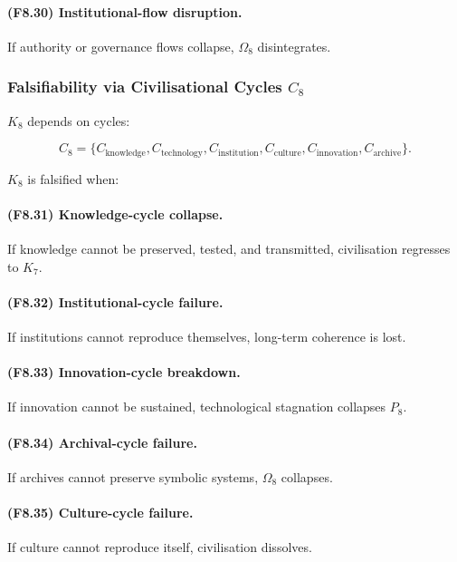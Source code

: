 \paragraph{(F8.30) Institutional-flow disruption.}
If authority or governance flows collapse,
$\Omega_8$ disintegrates.



\subsubsection{Falsifiability via Civilisational Cycles \texorpdfstring{$C_8$}{C_8}}

$K_8$ depends on cycles:

\[
C_8 = \{
C_{\mathrm{knowledge}},
C_{\mathrm{technology}},
C_{\mathrm{institution}},
C_{\mathrm{culture}},
C_{\mathrm{innovation}},
C_{\mathrm{archive}}
\}.
\]

$K_8$ is falsified when:

\paragraph{(F8.31) Knowledge-cycle collapse.}
If knowledge cannot be preserved, tested, and transmitted,  
civilisation regresses to $K_7$.

\paragraph{(F8.32) Institutional-cycle failure.}
If institutions cannot reproduce themselves,
long-term coherence is lost.

\paragraph{(F8.33) Innovation-cycle breakdown.}
If innovation cannot be sustained,
technological stagnation collapses $P_8$.

\paragraph{(F8.34) Archival-cycle failure.}
If archives cannot preserve symbolic systems,
$\Omega_8$ collapses.

\paragraph{(F8.35) Culture-cycle failure.}
If culture cannot reproduce itself,
civilisation dissolves.



